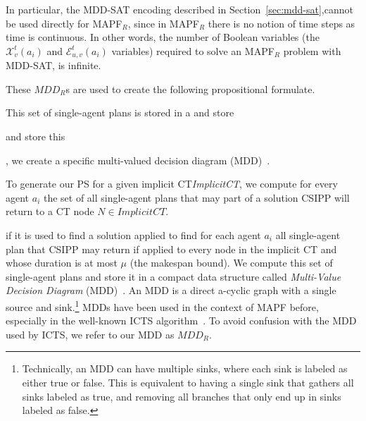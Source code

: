 \documentclass[review]{elsarticle}
\newcommand{\mddr}{\ensuremath{MDD_R}\xspace}
\newcommand{\mddrs}{\ensuremath{MDD_R}s\xspace}
\newcommand{\implicitct}{\textit{ImplicitCT}\xspace}
\newcommand{\ct}{\ac{CT}\xspace}
\newcommand{\csipp}{\ac{CSIPP}\xspace}
\newcommand{\ps}{\ac{PS}\xspace}
\newcommand{\mapfr}{\ac{MAPF}$_R$\xspace}
\newcommand{\mapf}{\ac{MAPF}\xspace}
\begin{document}
In particular, the MDD-SAT encoding described in Section~\ref{sec:mdd-sat},cannot be used directly for \mapfr, since in \mapfr there is no notion of time steps as time is continuous. 
In other words, the number of Boolean variables (the 
$\mathcal{X}_{v}^{t}(a_i)$ and 
$\mathcal{E}_{u,v}^{t}(a_i)$ variables) required to solve an \mapfr problem with MDD-SAT, is infinite. 



These \mddrs are used to create the following propositional formulate. 



This set of single-agent plans is stored in a
and store 


and store this 

, we create a specific multi-valued decision diagram (MDD)~\cite{srinivasan1990algorithms}. 





To generate our \ps for a given implicit \ct \implicitct, we compute for every agent $a_i$ the set of all single-agent plans that may part of a solution \csipp will return to a \ct node $N\in \implicitct$. 

if it is used to find a solution applied to find 
for each agent $a_i$ all single-agent plan that \csipp may return if applied to every node in the implicit \ct
and whose duration is at most $\mu$ (the makespan bound). 
We compute this set of single-agent plans and store it in a compact data structure called
\emph{Multi-Value Decision Diagram} (MDD)~\cite{srinivasan1990algorithms}. 
An MDD is a direct a-cyclic graph with a single source and sink.\footnote{Technically, an MDD can have multiple sinks, where each sink is labeled as either true or false. This is equivalent to having a single sink that gathers all sinks labeled as true, and removing all branches that only end up in sinks labeled as false.}
MDDs have been used in the context of \mapf before, especially in the well-known ICTS algorithm~\cite{sharon2013increasing}. To avoid confusion with the MDD used by ICTS, we refer to our MDD as \mddr. 
\end{document}
